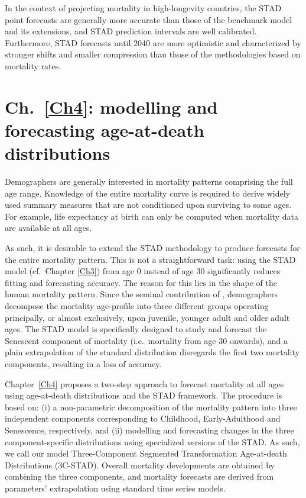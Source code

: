 \documentclass[Thesis]{subfiles}
\begin{document}
In the context of projecting mortality in high-longevity countries, the STAD point forecasts are generally more accurate than those of the benchmark \cite{lee1992modeling} model and its extensions, and STAD prediction intervals are well calibrated. Furthermore, STAD forecasts until 2040 are more optimistic and characterized by stronger shifts and smaller compression than those of the methodologies based on mortality rates.

\section{Ch.~\ref{Ch4}: modelling and forecasting age-at-death distributions}\label{Sec:Ch1sec7}
Demographers are generally interested in mortality patterns comprising the full age range. Knowledge of the entire mortality curve is required to derive widely used summary measures that are not conditioned upon surviving to some ages. For example, life expectancy at birth can only be computed when mortality data are available at all ages. 

As such, it is desirable to extend the STAD methodology to produce forecasts for the entire mortality pattern. This is not a straightforward task: using the STAD model (cf.~Chapter \ref{Ch3}) from age 0 instead of age 30 significantly reduces fitting and forecasting accuracy. The reason for this lies in the shape of the human mortality pattern. Since the seminal contribution of \cite{thiele1871mathematical}, demographers decompose the mortality age-profile into three different groups operating principally, or almost exclusively, upon juvenile, younger adult and older adult ages. The STAD model is specifically designed to study and forecast the Senescent component of mortality (i.e.~mortality from age 30 onwards), and a plain extrapolation of the standard distribution disregards the first two mortality components, resulting in a loss of accuracy.    

Chapter~\ref{Ch4} proposes a two-step approach to forecast mortality at all ages using age-at-death distributions and the STAD framework. The procedure is based on: (i) a non-parametric decomposition of the mortality pattern into three independent components corresponding to Childhood, Early-Adulthood and Senescence, respectively, and (ii) modelling and forecasting changes in the three component-specific distributions using specialized versions of the STAD. As such, we call our model Three-Component Segmented Transformation Age-at-death Distributions (3C-STAD). Overall mortality developments are obtained by combining the three components, and mortality forecasts are derived from parameters' extrapolation using standard time series models.  
\end{document}
